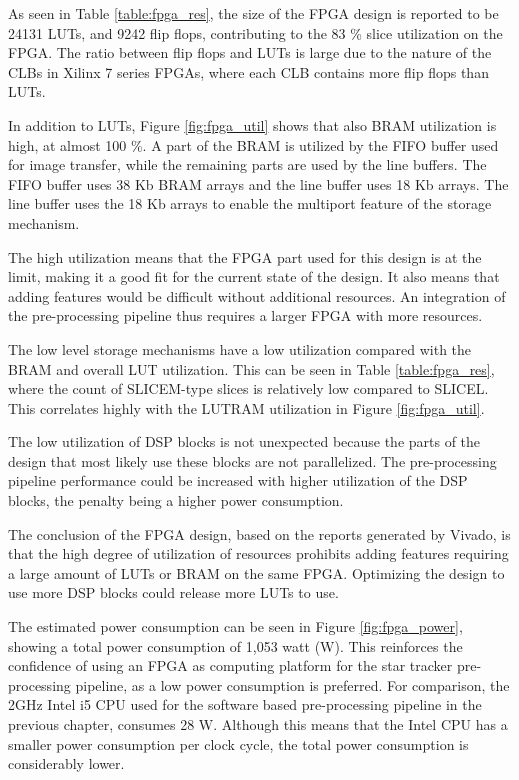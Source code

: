 \documentclass[12pt]{report}
\begin{document}
As seen in Table \ref*{table:fpga_res}, the size of the FPGA design is reported to be 24131 LUTs, and 9242 flip flops, contributing to the 83 \% slice utilization on the FPGA. The ratio between flip flops and LUTs is large due to the nature of the CLBs in Xilinx 7 series FPGAs, where each CLB contains more flip flops than LUTs.
\par
In addition to LUTs, Figure \ref*{fig:fpga_util} shows that also BRAM utilization is high, at almost 100 \%. A part of the BRAM is utilized by the FIFO buffer used for image transfer, while the remaining parts are used by the line buffers. The FIFO buffer uses 38 Kb BRAM arrays and the line buffer uses 18 Kb arrays. The line buffer uses the 18 Kb arrays to enable the multiport feature of the storage mechanism.
\par
The high utilization means that the FPGA part used for this design is at the limit, making it a good fit for the current state of the design. It also means that adding features would be difficult without additional resources. An integration of the pre-processing pipeline thus requires a larger FPGA with more resources.
\par
The low level storage mechanisms have a low utilization compared with the BRAM and overall LUT utilization. This can be seen in Table \ref*{table:fpga_res}, where the count of SLICEM-type slices is relatively low compared to SLICEL. This correlates highly with the LUTRAM utilization in Figure \ref*{fig:fpga_util}.
\par
The low utilization of DSP blocks is not unexpected because the parts of the design that most likely use these blocks are not parallelized. The pre-processing pipeline performance could be increased with higher utilization of the DSP blocks, the penalty being a higher power consumption. 
\par
The conclusion of the FPGA design, based on the reports generated by Vivado, is that the high degree of utilization of resources prohibits adding features requiring a large amount of LUTs or BRAM on the same FPGA. Optimizing the design to use more DSP blocks could release more LUTs to use.
\par
The estimated power consumption can be seen in Figure \ref*{fig:fpga_power}, showing a total power consumption of 1,053 watt (W). This reinforces the confidence of using an FPGA as computing platform for the star tracker pre-processing pipeline, as a low power consumption is preferred. For comparison, the 2GHz Intel i5 CPU used for the software based pre-processing pipeline in the previous chapter, consumes 28 W. Although this means that the Intel CPU has a smaller power consumption per clock cycle, the total power consumption is considerably lower.
\end{document}
